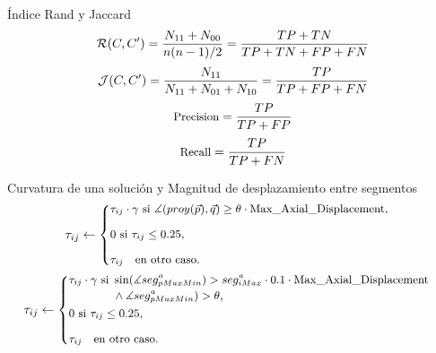 \begin{frame}{\'Indice Rand y Jaccard}
    \begin{equation}\fontsize{9pt}{7.2}\selectfont
        \mathcal{R}(C,C^{\prime}) = \frac{N_{11} + N_{00}}{n(n-1)/2} = \frac{TP + TN}{TP + TN + FP + FN}
    \end{equation}
    \vspace{0.2cm}
    \begin{equation}\fontsize{9pt}{7.2}\selectfont
        \mathcal{J}(C,C^{\prime}) = \frac{N_{11}}{N_{11} + N_{01} + N_{10}} = \frac{TP}{TP + FP + FN}
    \end{equation}
    \vspace{0.2cm}
    \begin{equation}\fontsize{9pt}{7.2}\selectfont
        \text{Precision} = \frac{TP}{TP + FP}
    \end{equation}
    \vspace{0.2cm}
    \begin{equation}\fontsize{9pt}{7.2}\selectfont
        \text{Recall} = \frac{TP}{TP + FN}
    \end{equation}
\end{frame}


\begin{frame}{Curvatura de una soluci\'on y Magnitud de desplazamiento entre segmentos}
    \centering
    \begin{equation}\fontsize{9pt}{7.2}\selectfont
    \tau_{ij} \leftarrow
        \begin{cases}
        \tau_{ij} \cdot \gamma \text{ si } \measuredangle(proy(\Vec{p}), \Vec{q}) \geq \theta \cdot \text{Max\_Axial\_Displacement},\\[3ex]
        
        \text{0 si } \tau_{ij} \leq 0.25, \\[3ex]
        \tau_{ij} \quad \text{en otro caso.}
        \end{cases}
    \end{equation}
    \vspace{1cm}
    \begin{equation}\fontsize{9pt}{7.2}\selectfont
    \tau_{ij} \leftarrow
        \begin{cases}
        \begin{split}
         \tau_{ij} \cdot \gamma \text{ si } & \sin(\measuredangle seg^{a}_{pMaxMin}) > seg^{a}_{iMax} \cdot 0.1 \cdot \text{Max\_Axial\_Displacement} \\ & \land \measuredangle seg^{a}_{pMaxMin}) > \theta,
        \end{split}
        \\[3ex]
        
        \text{0 si } \tau_{ij} \leq 0.25, \\[3ex]
        \tau_{ij} \quad \text{en otro caso}.
        \end{cases}
\end{equation}
\end{frame}

